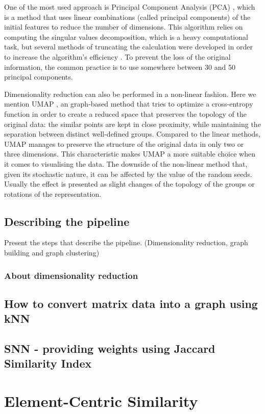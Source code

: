     One of the most used approach is Principal Component Analysis (PCA) \cite{WOLD198737}, which is a method that uses linear combinations (called principal components) of the initial features to reduce the number of dimensions. This algorithm relies on computing the singular values decomposition, which is a heavy computational task, but several methods of truncating the calculation were developed in order to increase the algorithm's efficiency \cite{Baglama2016IRLBAFP}. To prevent the loss of the original information, the common practice is to use somewhere between 30 and 50 principal components.

    Dimensionality reduction can also be performed in a non-linear fashion. Here we mention UMAP \cite{mcinnes2018uniform}, an graph-based method that tries to optimize a cross-entropy function in order to create a reduced space that preserves the topology of the original data: the similar points are kept in close proximity, while maintaining the separation between distinct well-defined groups. Compared to the linear methods, UMAP manages to preserve the structure of the original data in only two or three dimensions. This characteristic makes UMAP a more suitable choice when it comes to visualising the data. The downside of the non-linear method that, given its stochastic nature, it can be affected by the value of the random seeds. Usually the effect is presented as slight changes of the topology of the groups or rotations of the representation.
    \subsection{Describing the pipeline}
    Present the steps that describe the pipeline. (Dimensionality reduction, graph building and graph clustering)
    \subsubsection{About dimensionality reduction}
    
    \subsection{How to convert matrix data into a graph using kNN}
    \subsection{SNN - providing weights using Jaccard Similarity Index}
    

\section{Element-Centric Similarity}
